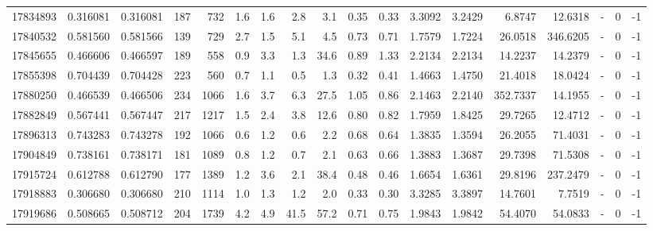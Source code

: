 \begin{tabular}{rrrrrrrrrrrrrrrlrr}
  17834893 & 0.316081 &   0.316081 &  187 &  732 &      1.6 &      1.6 &     2.8 &      3.1 &       0.35 &        0.33 &  3.3092 &  3.2429 &    6.8747 &   12.6318 &             - &        0 &         -1 \\
  17840532 & 0.581560 &   0.581566 &  139 &  729 &      2.7 &      1.5 &     5.1 &      4.5 &       0.73 &        0.71 &  1.7579 &  1.7224 &   26.0518 &  346.6205 &             - &        0 &         -1 \\
  17845655 & 0.466606 &   0.466597 &  189 &  558 &      0.9 &      3.3 &     1.3 &     34.6 &       0.89 &        1.33 &  2.2134 &  2.2134 &   14.2237 &   14.2379 &             - &        0 &         -1 \\
  17855398 & 0.704439 &   0.704428 &  223 &  560 &      0.7 &      1.1 &     0.5 &      1.3 &       0.32 &        0.41 &  1.4663 &  1.4750 &   21.4018 &   18.0424 &             - &        0 &         -1 \\
  17880250 & 0.466539 &   0.466506 &  234 & 1066 &      1.6 &      3.7 &     6.3 &     27.5 &       1.05 &        0.86 &  2.1463 &  2.2140 &  352.7337 &   14.1955 &             - &        0 &         -1 \\
  17882849 & 0.567441 &   0.567447 &  217 & 1217 &      1.5 &      2.4 &     3.8 &     12.6 &       0.80 &        0.82 &  1.7959 &  1.8425 &   29.7265 &   12.4712 &             - &        0 &         -1 \\
  17896313 & 0.743283 &   0.743278 &  192 & 1066 &      0.6 &      1.2 &     0.6 &      2.2 &       0.68 &        0.64 &  1.3835 &  1.3594 &   26.2055 &   71.4031 &             - &        0 &         -1 \\
  17904849 & 0.738161 &   0.738171 &  181 & 1089 &      0.8 &      1.2 &     0.7 &      2.1 &       0.63 &        0.66 &  1.3883 &  1.3687 &   29.7398 &   71.5308 &             - &        0 &         -1 \\
  17915724 & 0.612788 &   0.612790 &  177 & 1389 &      1.2 &      3.6 &     2.1 &     38.4 &       0.48 &        0.46 &  1.6654 &  1.6361 &   29.8196 &  237.2479 &             - &        0 &         -1 \\
  17918883 & 0.306680 &   0.306680 &  210 & 1114 &      1.0 &      1.3 &     1.2 &      2.0 &       0.33 &        0.30 &  3.3285 &  3.3897 &   14.7601 &    7.7519 &             - &        0 &         -1 \\
  17919686 & 0.508665 &   0.508712 &  204 & 1739 &      4.2 &      4.9 &    41.5 &     57.2 &       0.71 &        0.75 &  1.9843 &  1.9842 &   54.4070 &   54.0833 &             - &        0 &         -1 \\

\end{tabular}
